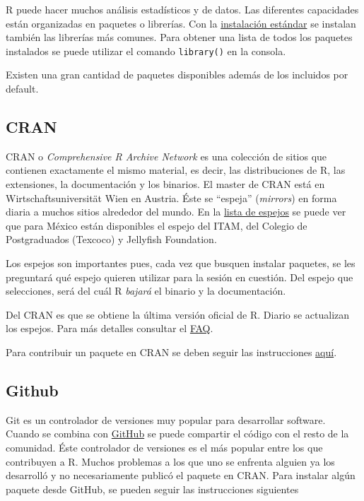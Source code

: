 \documentclass[]{article}
\begin{document}
R puede hacer muchos análisis estadísticos y de datos. Las diferentes
capacidades están organizadas en paquetes o librerías. Con la
\href{https://github.com/animalito/aprendeR/blob/master/lecture_01/0_instalacion.pdf}{instalación
estándar} se instalan también las librerías más comunes. Para obtener
una lista de todos los paquetes instalados se puede utilizar el comando
\texttt{library()} en la consola.

Existen una gran cantidad de paquetes disponibles además de los
incluidos por default.

\subsection{CRAN}\label{cran}

CRAN o \emph{Comprehensive R Archive Network} es una colección de sitios
que contienen exactamente el mismo material, es decir, las
distribuciones de R, las extensiones, la documentación y los binarios.
El master de CRAN está en Wirtschaftsuniversität Wien en Austria. Éste
se ``espeja'' (\emph{mirrors}) en forma diaria a muchos sitios alrededor
del mundo. En la \href{https://cran.r-project.org/mirrors.html}{lista de
espejos} se puede ver que para México están disponibles el espejo del
ITAM, del Colegio de Postgraduados (Texcoco) y Jellyfish Foundation.

Los espejos son importantes pues, cada vez que busquen instalar
paquetes, se les preguntará qué espejo quieren utilizar para la sesión
en cuestión. Del espejo que selecciones, será del cuál R \emph{bajará}
el binario y la documentación.

Del CRAN es que se obtiene la última versión oficial de R. Diario se
actualizan los espejos. Para más detalles consultar el
\href{https://cran.r-project.org/doc/FAQ/R-FAQ.html}{FAQ}.

Para contribuir un paquete en CRAN se deben seguir las instrucciones
\href{https://cran.r-project.org/web/packages/policies.html}{aquí}.

\subsection{Github}\label{github}

Git es un controlador de versiones muy popular para desarrollar
software. Cuando se combina con \href{https://github.com/}{GitHub} se
puede compartir el código con el resto de la comunidad. Éste controlador
de versiones es el más popular entre los que contribuyen a R. Muchos
problemas a los que uno se enfrenta alguien ya los desarrolló y no
necesariamente publicó el paquete en CRAN. Para instalar algún paquete
desde GitHub, se pueden seguir las instrucciones siguientes
\end{document}

